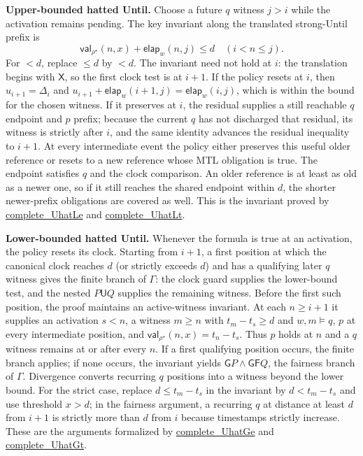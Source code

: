 \documentclass{ieeeaccess}
\newcommand{\Until}{\mathbin{\mathsf{U}}}
\newcommand{\Next}{\mathsf{X}}
\newcommand{\Always}{\mathsf{G}}
\newcommand{\Eventually}{\mathsf{F}}
\newcommand{\CVal}{\mathsf{val}}
\newcommand{\elapsed}{\mathsf{elap}}
\newcommand{\runinhead}[1]{\par\noindent\textbf{#1}\enspace}
\newcommand{\Rocqid}[1]{\url{#1}}
\begin{document}
\runinhead{Upper-bounded hatted Until.}
Choose a future $q$ witness $j>i$ while the activation remains pending. The
key invariant along the translated strong-Until prefix is
\begin{equation}
\CVal_{\rho^\star}(n,x)+\elapsed_w(n,j)\le d
\quad(i<n\le j).
\label{eq:canonical-until-invariant}
\end{equation}
For $<d$, replace $\le d$ by $<d$. The invariant need not hold at $i$:
the translation begins with $\Next$, so the first clock test is at $i+1$.
If the policy resets at $i$, then $u_{i+1}=\Delta_i$ and
$u_{i+1}+\elapsed_w(i+1,j)=\elapsed_w(i,j)$, which is within the bound for
the chosen witness. If it preserves at $i$, the residual supplies a still
reachable $q$ endpoint and $p$ prefix; because the current $q$ has not
discharged that residual, its witness is strictly after $i$, and the same
identity advances the residual inequality to $i+1$. At every intermediate
event the policy either preserves this useful older reference or resets to a
new reference whose MTL obligation is true. The endpoint satisfies $q$ and
the clock comparison. An older reference is at least as old as a newer one,
so if it still reaches the shared endpoint within $d$, the shorter
newer-prefix obligations are covered as well. This is the invariant proved
by \Rocqid{complete_UhatLe} and \Rocqid{complete_UhatLt}.

\runinhead{Lower-bounded hatted Until.}
Whenever the formula is true at an activation, the policy resets its clock.
Starting from $i+1$, a first position at which the canonical clock reaches
$d$ (or strictly exceeds $d$) and has a qualifying later $q$ witness gives
the finite branch of $\Gamma$: the clock guard supplies the lower-bound
test, and the nested $P\Until Q$ supplies the remaining witness. Before the
first such position, the proof maintains an active-witness invariant. At
each $n\ge i+1$ it supplies an activation $s<n$, a witness $m\ge n$ with
$t_m-t_s\ge d$ and $w,m\models q$, $p$ at every intermediate position, and
$\CVal_{\rho^\star}(n,x)=t_n-t_s$. Thus $p$ holds at $n$ and a $q$ witness
remains at or after every $n$. If a first qualifying position occurs, the
finite branch applies; if none occurs, the invariant yields
$\Always P\land\Always\Eventually Q$, the fairness branch of $\Gamma$.
Divergence converts recurring $q$ positions into a witness beyond the
lower bound. For the strict case, replace $d\le t_m-t_s$ in the invariant
by $d<t_m-t_s$ and use threshold $x>d$; in the fairness argument, a
recurring $q$ at distance at least $d$ from $i+1$ is strictly more than $d$
from $i$ because timestamps strictly increase. These are the arguments
formalized by \Rocqid{complete_UhatGe} and \Rocqid{complete_UhatGt}.
\end{document}
